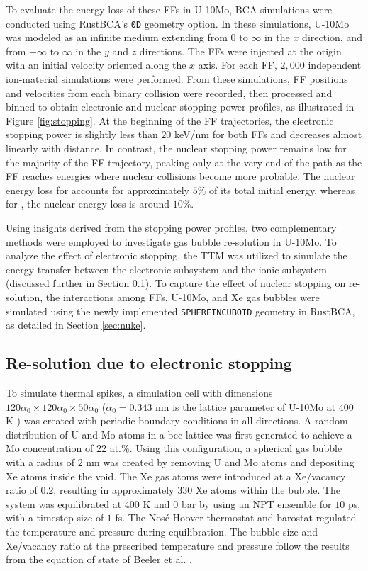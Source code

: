 \documentclass[review]{elsarticle}
\newcommand{\Y}{\ce{_{39}^{97}Y}\xspace}
\newcommand{\I}{\ce{_{53}^{136}I}\xspace}
\begin{document}
To evaluate the energy loss of these FFs in U-10Mo, BCA simulations were conducted using RustBCA's \texttt{0D} geometry option. In these simulations, U-10Mo was modeled as an infinite medium extending from $0$ to $\infty$ in the $x$ direction, and from $-\infty$ to $\infty $ in the $y$ and $z$ directions. The FFs were injected at the origin with an initial velocity oriented along the $x$ axis. For each FF, $2,000$ independent ion-material simulations were performed. From these simulations, FF positions and velocities from each binary collision were recorded, then processed and binned to obtain electronic and nuclear stopping power profiles, as illustrated in Figure \ref{fig:stopping}. At the beginning of the FF trajectories, the electronic stopping power is slightly less than $20$ keV/nm for both FFs and decreases almost linearly with distance. In contrast, the nuclear stopping power remains low for the majority of the FF trajectory, peaking only at the very end of the path as the FF reaches energies where nuclear collisions become more probable. The nuclear energy loss for \Y accounts for approximately $5\%$ of its total initial energy, whereas for \I, the nuclear energy loss is around $10\%$.

Using insights derived from the stopping power profiles, two complementary methods were employed to investigate gas bubble re-solution in U-10Mo. To analyze the effect of electronic stopping, the TTM was utilized to simulate the energy transfer between the electronic subsystem and the ionic subsystem (discussed further in Section \ref{sec:elec}). To capture the effect of nuclear stopping on re-solution, the interactions among FFs, U-10Mo, and Xe gas bubbles were simulated using the newly implemented \texttt{SPHEREINCUBOID} geometry in RustBCA, as detailed in Section \ref{sec:nuke}.

\subsection{Re-solution due to electronic stopping}
\label{sec:elec}

To simulate thermal spikes, a simulation cell with dimensions $120 \alpha_0 \times 120 \alpha_0 \times 50 \alpha_0$ ($\alpha_0 = 0.343$ nm is the lattice parameter of U-10Mo at $400$ K \cite{phillips2010}) was created with periodic boundary conditions in all directions. A random distribution of U and Mo atoms in a bcc lattice was first generated to achieve a Mo concentration of $22$ at.\%. Using this configuration, a spherical gas bubble with a radius of $2$ nm was created by removing U and Mo atoms and depositing Xe atoms inside the void. The Xe gas atoms were introduced at a Xe/vacancy ratio of $0.2$, resulting in approximately $330$ Xe atoms within the bubble. The system was equilibrated at $400$ K and $0$ bar by using an NPT ensemble for $10$ ps, with a timestep size of $1$ fs. The Nos\'e-Hoover thermostat and barostat regulated the temperature and pressure during equilibration. The bubble size and Xe/vacancy ratio at the prescribed temperature and pressure follow the results from the equation of state of Beeler et al. \cite{beeler2020improved}.
\end{document}
